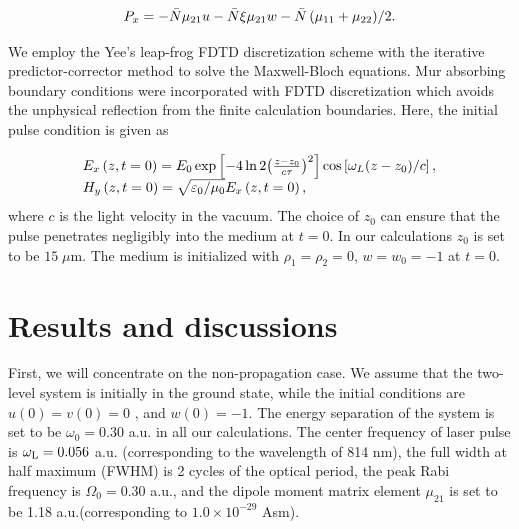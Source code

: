 \documentclass[10pt,letterpaper]{article}
\begin{document}
\begin{equation}
{P_x} =  - \bar{N}{\mu _{21}}u - \bar{N}\xi {\mu _{21}}w - {{\bar{N}\left( {{\mu _{11}} + {\mu _{22}}} \right)} \mathord{\left/
		{\vphantom {{N\left( {{\mu _{11}} + {\mu _{22}}} \right)} 2}} \right.
		\kern-\nulldelimiterspace} 2}.
\label{eq12}
\end{equation}

We employ the Yee's leap-frog FDTD discretization scheme \cite{Yee} with the iterative predictor-corrector method \cite{Ziolkowski-Two-Level-Method-PRA-1995} to solve the Maxwell-Bloch equations. Mur absorbing boundary conditions \cite{Mur-Absorption} were incorporated with FDTD discretization which avoids the unphysical reflection from the finite calculation boundaries. Here, the initial pulse condition is given as

\begin{equation}
\begin{array}{l}
{E_x}\left( {z,t = 0} \right) = {E_0}\exp \left[ { - 4\ln 2{{\left( {\frac{{z - {z_0}}}{{c\tau }}} \right)}^2}} \right]\cos \left[ {{\omega _L}{{\left( {z - {z_0}} \right)} \mathord{\left/
			{\vphantom {{\left( {z - {z_0}} \right)} c}} \right.
			\kern-\nulldelimiterspace} c}} \right],\\
{H_y}\left( {z,t = 0} \right) = \sqrt {{{{\varepsilon _0}} \mathord{\left/
			{\vphantom {{{\varepsilon _0}} {{\mu _0}}}} \right.
			\kern-\nulldelimiterspace} {{\mu _0}}}} {E_x}\left( {z,t = 0} \right),
\end{array}
\label{eq13}
\end{equation}
where $ c $ is the light velocity in the vacuum. The choice of $ z_{0} $ can ensure that the pulse penetrates negligibly into the medium at $ t=0 $. In our calculations $ z_{0} $ is set to be $15\;\mu$m. The medium is initialized with  ${\rho _1} = {\rho _2} = 0$, $w = {w_0} =  - 1$ at $ t=0 $. 

\section{Results and discussions}
First, we will concentrate on the non-propagation case. We assume that the two-level system is initially in the ground state, while the initial conditions are $ u(0)=v(0)=0 $ , and $ w(0)=-1 $. The energy separation of the system is set to be $ \omega_{0}=0.30$ a.u.  in all our calculations. The center frequency of laser pulse is $ \omega_{\rm{L}}=0.056 $ a.u. (corresponding to the wavelength of 814 nm), the full width at half maximum (FWHM) is 2 cycles of the optical period, the peak Rabi frequency is $ \Omega_{0}=0.30 $ a.u., and the dipole moment matrix element $ \mu_{21} $  is set to be 1.18 a.u.(corresponding to  $ 1.0\times10^{-29} $ Asm).
\end{document}
